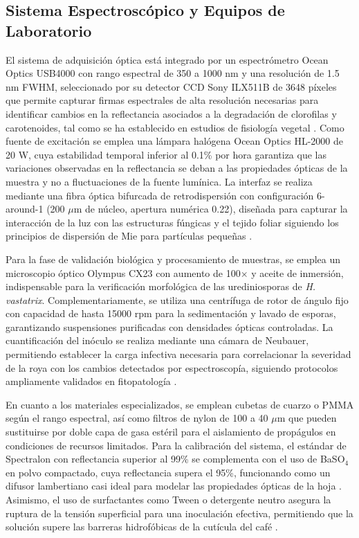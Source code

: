 \documentclass[12pt, a4paper]{article}
\begin{document}
	\subsection{Sistema Espectroscópico y Equipos de Laboratorio}
	
	El sistema de adquisición óptica está integrado por un espectrómetro Ocean Optics USB4000 con rango espectral de 350 a 1000 nm y una resolución de 1.5 nm FWHM, seleccionado por su detector CCD Sony ILX511B de 3648 píxeles que permite capturar firmas espectrales de alta resolución necesarias para identificar cambios en la reflectancia asociados a la degradación de clorofilas y carotenoides, tal como se ha establecido en estudios de fisiología vegetal \parencite{lichtenthaler2001}. Como fuente de excitación se emplea una lámpara halógena Ocean Optics HL-2000 de 20 W, cuya estabilidad temporal inferior al 0.1\% por hora garantiza que las variaciones observadas en la reflectancia se deban a las propiedades ópticas de la muestra y no a fluctuaciones de la fuente lumínica. La interfaz se realiza mediante una fibra óptica bifurcada de retrodispersión con configuración 6-around-1 (200 $\mu$m de núcleo, apertura numérica 0.22), diseñada para capturar la interacción de la luz con las estructuras fúngicas y el tejido foliar siguiendo los principios de dispersión de Mie para partículas pequeñas \parencite{bohren1983, vandeHulst1981}.
	
	Para la fase de validación biológica y procesamiento de muestras, se emplea un microscopio óptico Olympus CX23 con aumento de 100× y aceite de inmersión, indispensable para la verificación morfológica de las urediniosporas de \textit{H. vastatrix}. Complementariamente, se utiliza una centrífuga de rotor de ángulo fijo con capacidad de hasta 15000 rpm para la sedimentación y lavado de esporas, garantizando suspensiones purificadas con densidades ópticas controladas. La cuantificación del inóculo se realiza mediante una cámara de Neubauer, permitiendo establecer la carga infectiva necesaria para correlacionar la severidad de la roya con los cambios detectados por espectroscopía, siguiendo protocolos ampliamente validados en fitopatología \parencite{Talhinhas2017}.
	
	En cuanto a los materiales especializados, se emplean cubetas de cuarzo o PMMA según el rango espectral, así como filtros de nylon de 100 a 40 $\mu$m que pueden sustituirse por doble capa de gasa estéril para el aislamiento de propágulos en condiciones de recursos limitados. Para la calibración del sistema, el estándar de Spectralon con reflectancia superior al 99\% se complementa con el uso de BaSO$_4$ en polvo compactado, cuya reflectancia supera el 95\%, funcionando como un difusor lambertiano casi ideal para modelar las propiedades ópticas de la hoja \parencite{jacquemoud2009}. Asimismo, el uso de surfactantes como Tween o detergente neutro asegura la ruptura de la tensión superficial para una inoculación efectiva, permitiendo que la solución supere las barreras hidrofóbicas de la cutícula del café \parencite{Silva2006, Velasquez2020}.
	
\end{document}
